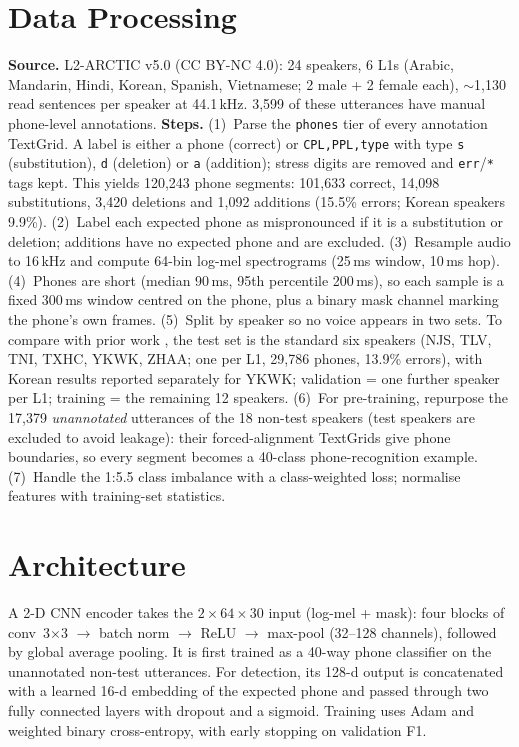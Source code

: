 \documentclass[final]{article}
\begin{document}
\section*{Data Processing}
\textbf{Source.} L2-ARCTIC v5.0 \cite{zhao2018l2arctic} (CC BY-NC 4.0): 24 speakers, 6 L1s (Arabic, Mandarin,
Hindi, Korean, Spanish, Vietnamese; 2 male + 2 female each), $\sim$1,130 read sentences per speaker at 44.1\,kHz.
3,599 of these utterances have manual phone-level annotations. \textbf{Steps.}
(1)~Parse the \texttt{phones} tier of every annotation TextGrid. A label is either a phone (correct) or
\texttt{CPL,PPL,type} with type \texttt{s} (substitution), \texttt{d} (deletion) or \texttt{a} (addition); stress digits
are removed and \texttt{err}/\texttt{*} tags kept. This yields 120,243 phone segments: 101,633 correct, 14,098
substitutions, 3,420 deletions and 1,092 additions (15.5\% errors; Korean speakers 9.9\%).
(2)~Label each expected phone as mispronounced if it is a substitution or deletion; additions have no expected
phone and are excluded. (3)~Resample audio to 16\,kHz and compute 64-bin log-mel spectrograms
(25\,ms window, 10\,ms hop). (4)~Phones are short (median 90\,ms, 95th percentile 200\,ms), so each sample is a fixed
300\,ms window centred on the phone, plus a binary mask channel marking the phone's own frames.
(5)~Split by speaker so no voice appears in two sets. To compare with prior work \cite{peng2021study}, the
test set is the standard six speakers (NJS, TLV, TNI, TXHC, YKWK, ZHAA; one per L1, 29,786 phones, 13.9\% errors),
with Korean results reported separately for YKWK; validation = one further speaker per L1; training = the
remaining 12 speakers. (6)~For pre-training, repurpose the 17,379 \emph{unannotated} utterances of the
18 non-test speakers (test speakers are excluded to avoid leakage): their forced-alignment TextGrids give phone
boundaries, so every segment becomes a 40-class phone-recognition example.
(7)~Handle the 1:5.5 class imbalance with a class-weighted loss; normalise features with training-set statistics.

\section*{Architecture}
A 2-D CNN encoder takes the $2\times64\times30$ input (log-mel + mask): four blocks of
conv~3$\times$3 $\rightarrow$ batch norm $\rightarrow$ ReLU $\rightarrow$ max-pool (32--128 channels),
followed by global average pooling. It is first trained as a 40-way phone classifier on the unannotated non-test utterances.
For detection, its 128-d output is concatenated with a learned 16-d embedding of the expected phone and passed
through two fully connected layers with dropout and a sigmoid. Training uses Adam and weighted binary
cross-entropy, with early stopping on validation F1.
\end{document}
